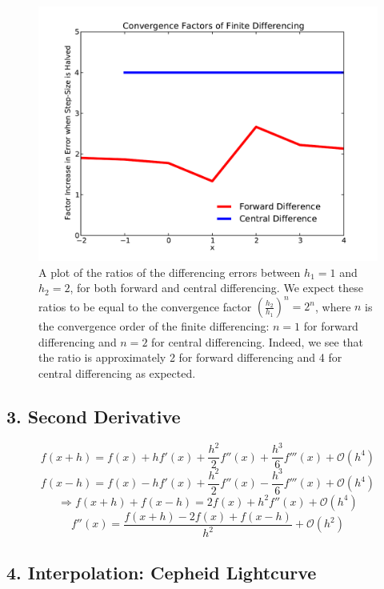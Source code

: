 \documentclass{article}
\begin{document}
\begin{spacing}{1.1}
\begin{figure}[H]
 \label{fig2-2}
 \includegraphics[width=\textwidth]{problem2_fig2.pdf}
 \caption{A plot of the ratios of the differencing errors between \(h_1 = 1\) and \(h_2 = 2\), for both forward and central differencing. We expect these ratios to be equal to the convergence factor \(\left( \frac{h_2}{h_1} \right)^n = 2^n\), where \(n\) is the convergence order of the finite differencing: \(n = 1\) for forward differencing and \(n = 2\) for central differencing. Indeed, we see that the ratio is approximately 2 for forward differencing and 4 for central differencing as expected.}
\end{figure} 

\newpage

\subsection{3. Second Derivative}

\[
f(x+h) = f(x) + h f'(x) + \frac{h^2}{2} f''(x) + \frac{h^3}{6} f'''(x) + \mathcal{O}(h^4)
\]
\[
f(x-h) = f(x) - h f'(x) + \frac{h^2}{2} f''(x) - \frac{h^3}{6} f'''(x) + \mathcal{O}(h^4)
\]
\[
\Rightarrow f(x+h) + f(x-h) = 2f(x) + h^2 f''(x) + \mathcal{O}(h^4)
\]
\begin{equation}
\boxed{f''(x) = \frac{f(x+h) - 2f(x) + f(x-h)}{h^2} + \mathcal{O}(h^2)}
\end{equation}

\vspace{1cm}

\subsection{4. Interpolation: Cepheid Lightcurve}


\end{spacing}
\end{document}

